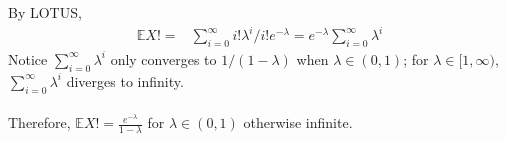 
\setcounter{theorem}{60}
\begin{exercise} [BH.4.61]
\begin{solution}
    By LOTUS, 
	\begin{align*}
		\mathbb{E}X! = & \sum_{i=0}^\infty i! \lambda^i /i! e^{-\lambda} =e^{-\lambda} \sum_{i=0}^\infty \lambda^i  
	\end{align*}
	Notice $\sum_{i=0}^\infty \lambda^i $ only converges to $ 1/(1-\lambda)$ when $\lambda\in (0,1)$; for $\lambda\in [1,\infty)$, $\sum_{i=0}^\infty \lambda^i $ diverges to infinity.  \\~\\
	Therefore, $\mathbb{E}X! =\frac{e^{-\lambda}}{1-\lambda}$ for $\lambda\in (0,1)$ otherwise infinite.
\end{solution}
\end{exercise}

